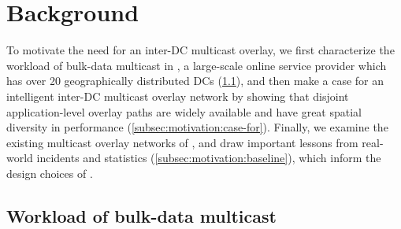 \section{Background}
\label{sec:motivation}


To motivate the need for an inter-DC multicast overlay,
we first characterize the workload of bulk-data multicast in
\company, a large-scale online service provider which has over
20 geographically distributed DCs
(\Section\ref{subsec:motivation:multicast-traffic}),
and then make a case for an intelligent inter-DC multicast
overlay network by showing that disjoint application-level
overlay paths are widely available and have great spatial
diversity in performance
(\Section\ref{subsec:motivation:case-for}).
Finally, we examine the existing multicast overlay networks
of \company, and draw important lessons from real-world incidents
and statistics (\Section\ref{subsec:motivation:baseline}),
which inform the design choices of \name.


\subsection{Workload of bulk-data multicast}
\label{subsec:motivation:multicast-traffic}


